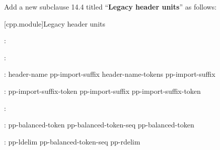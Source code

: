 Add a new subclause 14.4 titled ``\textbf{Legacy header units}'' as follows:

\setcounter{section}{3}
[cpp.module]{Legacy header units}%
\resetalinea[0]

\begin{std.txt}
\color{addclr}
\begin{bnf}
:\br
  \opt{} \opt{} 
\end{bnf}

\begin{bnf}
:\br
\end{bnf}

\begin{bnf}
:\br
   header-name pp-import-suffix\opt{} \terminal{;}\br
   header-name-tokens pp-import-suffix\opt{} \terminal{;}
\end{bnf}

\begin{bnf}
:\br
  pp-import-suffix-token\br
  pp-import-suffix pp-import-suffix-token
\end{bnf}

\begin{bnf}
:\br
\end{bnf}

\begin{bnf}
:\br
  pp-balanced-token\br
  pp-balanced-token-seq pp-balanced-token
\end{bnf}

\begin{bnf}
:\br
  pp-ldelim pp-balanced-token-seq\opt{} pp-rdelim\br
\end{bnf}

\begin{bnf}
 \br
  \terminal{(    [    \{    <:    <\%}
\end{bnf}

\begin{bnf}
 \br
  \terminal{)    ]    \}    :>    \%>}
\end{bnf}


\end{std.txt}
